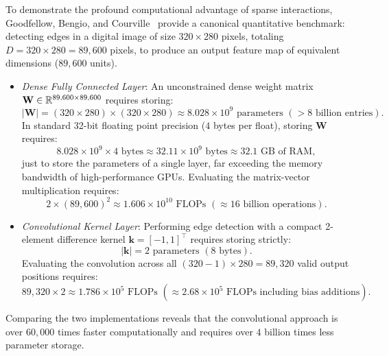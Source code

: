 To demonstrate the profound computational advantage of sparse interactions, Goodfellow, Bengio, and Courville~\cite{goodfellow2016deep} provide a canonical quantitative benchmark: detecting edges in a digital image of size $320 \times 280$ pixels, totaling $D = 320 \times 280 = 89,600$ pixels, to produce an output feature map of equivalent dimensions ($89,600$ units).
\begin{itemize}[leftmargin=*]
  \item \textit{Dense Fully Connected Layer}:
    An unconstrained dense weight matrix $\mathbf{W} \in \mathbb{R}^{89,600 \times 89,600}$ requires storing:
    \begin{equation}
    |\mathbf{W}| = (320 \times 280) \times (320 \times 280) \approx 8.028 \times 10^9 \text{ parameters } (>8 \text{ billion entries}).
    \end{equation}
    In standard 32-bit floating point precision ($4$ bytes per float), storing $\mathbf{W}$ requires:
    \begin{equation}
    8.028 \times 10^9 \times 4\text{ bytes} \approx 32.11 \times 10^9\text{ bytes} \approx 32.1\text{ GB of RAM},
    \end{equation}
    just to store the parameters of a single layer, far exceeding the memory bandwidth of high-performance GPUs. Evaluating the matrix-vector multiplication requires:
    \begin{equation}
    2 \times (89,600)^2 \approx 1.606 \times 10^{10} \text{ FLOPs } (\approx 16 \text{ billion operations}).
    \end{equation}
  
  \item \textit{Convolutional Kernel Layer}:
    Performing edge detection with a compact 2-element difference kernel $\mathbf{k} = [-1, 1]^\top$ requires storing strictly:
    \begin{equation}
    |\mathbf{k}| = 2 \text{ parameters } (8\text{ bytes}).
    \end{equation}
    Evaluating the convolution across all $(320 - 1) \times 280 = 89,320$ valid output positions requires:
    \begin{equation}
    89,320 \times 2 \approx 1.786 \times 10^5 \text{ FLOPs } (\approx 2.68 \times 10^5 \text{ FLOPs including bias additions}).
    \end{equation}
\end{itemize}
Comparing the two implementations reveals that the convolutional approach is over $60,000$ times faster computationally and requires over $4$ billion times less parameter storage.

